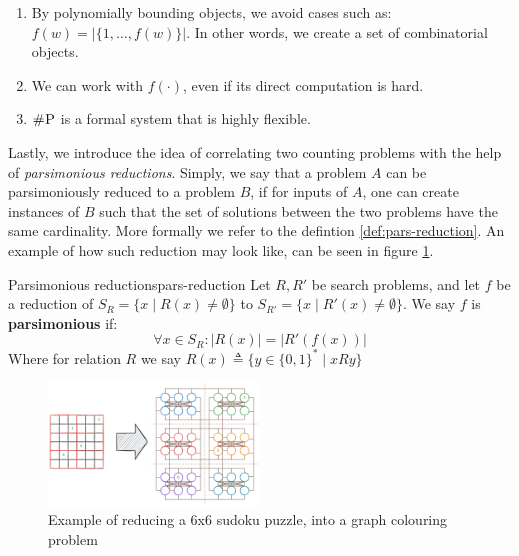 \begin{enumerate}%
    \item By polynomially bounding objects, we avoid cases such as: $f(w) = |\{1, \hdots, f(w)\}|$. In other words, we create a set
          of combinatorial objects.
    \item We can work with $f(\cdot)$, even if its direct computation is hard.
    \item $\textsc{\#P}$ is a formal system that is highly flexible.
\end{enumerate}

Lastly, we introduce the idea of correlating two counting problems with the help of
\textit{parsimonious reductions}. Simply, we say
that a problem $A$ can be parsimoniously reduced to a problem $B$, if for inputs of $A$,
one can create instances of $B$ such that the set of solutions between the two problems
have the same cardinality. More formally we refer to the defintion \ref{def:pars-reduction}.
An example of how such reduction may look like, can be seen in figure \ref{fig:chap-2:pars-reduction}.


\begin{definitionbox}{Parsimonious reductions}{pars-reduction}
    Let $R, R'$ be search problems, and let $f$ be a reduction of
    $S_R = \{x \mid R(x) \neq \emptyset \}$ to $S_{R'} = \{x \mid R'(x) \neq \emptyset \}$.
    We say $f$ is \textbf{parsimonious} if:
    $$
        \forall x \in S_R : |R(x)| = |R'(f(x))|
    $$
    Where for relation $R$ we say $R(x) \triangleq \{y \in \{0,1\}^* \mid xRy \}$
\end{definitionbox}

\begin{figure}
    \centering
    \includegraphics[width=0.5\textwidth]{Chapter2/parsimonious-reduction-example.pdf}
    \caption{Example of reducing a 6x6 sudoku puzzle, into a graph colouring problem}
    \label{fig:chap-2:pars-reduction}
\end{figure}

